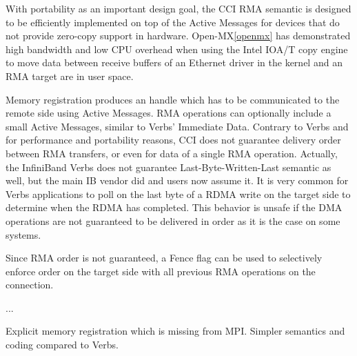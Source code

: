 With portability as an important design goal, the CCI RMA semantic is 
designed to be efficiently implemented on top of the Active Messages 
for devices that do not provide zero-copy support in hardware. 
Open-MX\ref{openmx} has demonstrated high bandwidth and low CPU 
overhead when using the Intel IOA/T copy engine to move data between receive 
buffers of an Ethernet driver in the kernel and an RMA target are in user 
space.

Memory registration produces an handle which has to be communicated to the 
remote side using Active Messages. RMA operations can optionally include a 
small Active Messages, similar to Verbs' Immediate Data. Contrary to Verbs 
and for performance and portability reasons, CCI does not guarantee delivery 
order between RMA transfers, or even for data of a single RMA operation. 
Actually, the InfiniBand Verbs does not guarantee Last-Byte-Written-Last 
semantic as well, but the main IB vendor did and users now assume it. It is 
very common for Verbs applications to poll on the last byte of a RDMA write 
on the target side to determine when the RDMA has completed. This behavior is 
unsafe if the DMA operations are not guaranteed to be delivered in order as 
it is the case on some systems.

Since RMA order is not guaranteed, a Fence flag can be used to selectively 
enforce order on the target side with all previous RMA operations on the 
connection.

...

 Explicit memory registration which is missing from MPI. Simpler semantics and coding compared to Verbs.
